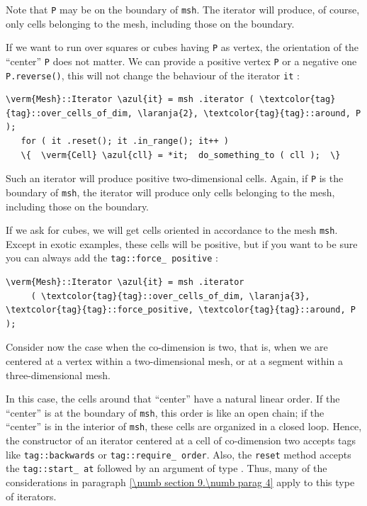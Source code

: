 Note that {\small\tt P} may be on the boundary of {\small\tt msh}.
The iterator will produce, of course, only cells belonging to the mesh, including those
on the boundary.

If we want to run over squares or cubes having {\small\tt P} as vertex,
the orientation of the ``center'' {\small\tt P} does not matter.
We can provide a positive vertex {\small\tt P} or a negative one {\small\tt P.reverse()},
this will not change the behaviour of the iterator {\small\tt it} :

\begin{Verbatim}[commandchars=\\\{\},formatcom=\small\tt,
   baselinestretch=0.94,framesep=2mm                      ]
   \verm{Mesh}::Iterator \azul{it} = msh .iterator ( \textcolor{tag}{tag}::over_cells_of_dim, \laranja{2}, \textcolor{tag}{tag}::around, P );
   for ( it .reset(); it .in_range(); it++ )
   \{  \verm{Cell} \azul{cll} = *it;  do_something_to ( cll );  \}
\end{Verbatim}

Such an iterator will produce positive two-dimensional cells.
Again, if {\small\tt P} is the boundary of {\small\tt msh}, the iterator will produce
only cells belonging to the mesh, including those on the boundary.

If we ask for cubes, we will get cells oriented in accordance to the mesh {\small\tt msh}.
Except in exotic examples, these cells will be positive, but if you want to be sure you
can always add the {\small\tt\textcolor{tag}{tag}::force\_\,positive} :

\begin{Verbatim}[commandchars=\\\{\},formatcom=\small\tt,
   baselinestretch=0.94,framesep=2mm                      ]
  \verm{Mesh}::Iterator \azul{it} = msh .iterator
     ( \textcolor{tag}{tag}::over_cells_of_dim, \laranja{3}, \textcolor{tag}{tag}::force_positive, \textcolor{tag}{tag}::around, P );
\end{Verbatim}

Consider now the case when the co-dimension is two, that is, when we are centered at a vertex
within a two-dimensional mesh, or at a segment within a three-dimensional mesh.

In this case, the cells around that ``center'' have a natural linear order.
If the ``center'' is at the boundary of {\small\tt msh}, this order is like an
open chain; if the ``center'' is in the interior of {\small\tt msh}, these cells
are organized in a closed loop.
Hence, the constructor of an iterator centered at a cell of co-dimension two accepts
tags like {\small\tt\textcolor{tag}{tag}::backwards} or {\small\tt\textcolor{tag}{tag}::require\_\,order}.
Also, the {\small\tt reset} method accepts the {\small\tt\textcolor{tag}{tag}::start\_\,at} followed
by an argument of type {\small\tt{}}.
Thus, many of the considerations in paragraph \ref{\numb section 9.\numb parag 4}
apply to this type of iterators.

